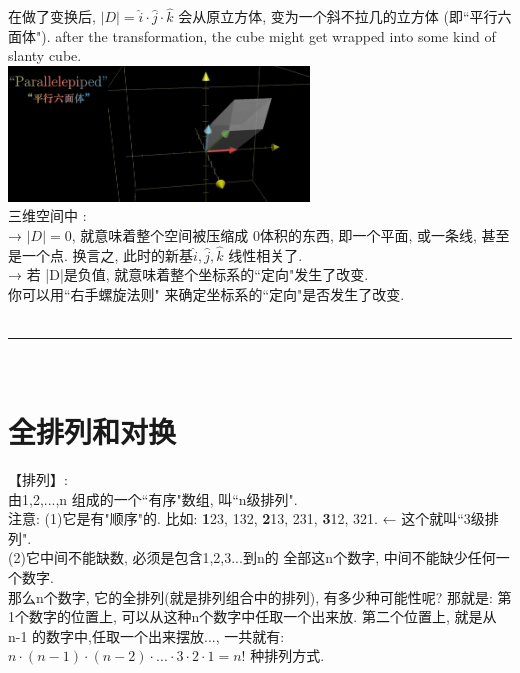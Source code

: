 \documentclass[UTF8]{ctexart}
\begin{document}
在做了变换后, $ |D| = \hat{i} \cdot \hat{j} \cdot \hat{k} $ 会从原立方体, 变为一个斜不拉几的立方体 (即``平行六面体"). after the  transformation, the cube might get wrapped into some kind of slanty cube.\\

\includegraphics[width=0.6\textwidth]{img/0046.png}\\

三维空间中 : \\
→ $|D|=0$, 就意味着整个空间被压缩成 0体积的东西, 即一个平面, 或一条线, 甚至是一个点. 换言之, 此时的新基$ \hat{i}, \hat{j}, \hat{k}$ 线性相关了.\\
→ 若 |D|是负值, 就意味着整个坐标系的``定向"发生了改变. \\

你可以用``右手螺旋法则" 来确定坐标系的``定向"是否发生了改变.\\





~\\
\hrule
~\\

	
	\section{全排列和对换}
	
	【排列】:\\
	由1,2,...,n 组成的一个``有序"数组, 叫``n级排列".\\
	注意: (1)它是有"顺序"的. 比如: \textbf{1}23, 132, \textbf{2}13, 231, \textbf{3}12, 321.  ← 这个就叫``3级排列".\\
	
	(2)它中间不能缺数, 必须是包含1,2,3...到n的 全部这n个数字, 中间不能缺少任何一个数字. \\
	那么n个数字, 它的全排列(就是排列组合中的排列), 有多少种可能性呢? 那就是: 第1个数字的位置上, 可以从这种n个数字中任取一个出来放. 第二个位置上, 就是从 n-1 的数字中,任取一个出来摆放..., 一共就有: $n\cdot \left( n-1 \right) \cdot \left( n-2 \right) \cdot ...\cdot 3\cdot 2\cdot 1 = n!	$ 种排列方式.\\
	
\end{document}
